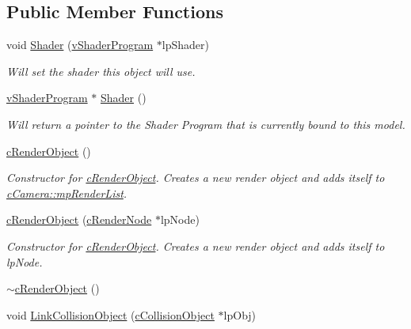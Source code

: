 \subsection*{Public Member Functions}
\begin{DoxyCompactItemize}
\item 
void \hyperlink{classc_render_object_a4ccf0881a96909f31ede6139b8246f61}{Shader} (\hyperlink{classv_shader_program}{vShaderProgram} $\ast$lpShader)
\begin{DoxyCompactList}\small\item\em Will set the shader this object will use. \item\end{DoxyCompactList}\item 
\hyperlink{classv_shader_program}{vShaderProgram} $\ast$ \hyperlink{classc_render_object_a4511be39ce33b59a02099749947fa5a3}{Shader} ()
\begin{DoxyCompactList}\small\item\em Will return a pointer to the Shader Program that is currently bound to this model. \item\end{DoxyCompactList}\item 
\hyperlink{classc_render_object_a4c53fe5d3df67ba2e15001e9c939f94f}{cRenderObject} ()
\begin{DoxyCompactList}\small\item\em Constructor for \hyperlink{classc_render_object}{cRenderObject}. Creates a new render object and adds itself to \hyperlink{classc_camera_a642cdd541d3837608830f2b851bcd8d0}{cCamera::mpRenderList}. \item\end{DoxyCompactList}\item 
\hyperlink{classc_render_object_a91246fbf5e6de19a25d984f0fff71956}{cRenderObject} (\hyperlink{classc_render_node}{cRenderNode} $\ast$lpNode)
\begin{DoxyCompactList}\small\item\em Constructor for \hyperlink{classc_render_object}{cRenderObject}. Creates a new render object and adds itself to lpNode. \item\end{DoxyCompactList}\item 
\hyperlink{classc_render_object_aef0efadb31f222418fc7a414c556e6a2}{$\sim$cRenderObject} ()
\item 
void \hyperlink{classc_render_object_a9cd352514159783b312cf9d3a6168e8e}{LinkCollisionObject} (\hyperlink{classc_collision_object}{cCollisionObject} $\ast$lpObj)

\end{DoxyCompactItemize}
